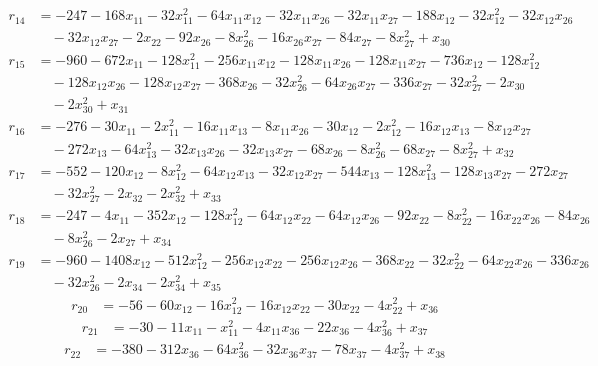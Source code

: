 \begin{align*}
r_{14}&=
-247-168x_{11}-32x_{11}^{2}-64x_{11}x_{12}-32x_{11}x_{26}-32x_{11}x_{27}-188x_{12}-32x_{12}^{2}-32x_{12}x_{26} \\
&\quad -32x_{12}x_{27}-2x_{22}-92x_{26}-8x_{26}^{2}-16x_{26}x_{27}-84x_{27}-8x_{27}^{2}+x_{30}
\end{align*}
\begin{align*}
r_{15}&=
-960-672x_{11}-128x_{11}^{2}-256x_{11}x_{12}-128x_{11}x_{26}-128x_{11}x_{27}-736x_{12}-128x_{12}^{2} \\
&\quad -128x_{12}x_{26}-128x_{12}x_{27}-368x_{26}-32x_{26}^{2}-64x_{26}x_{27}-336x_{27}-32x_{27}^{2}-2x_{30} \\
&\quad -2x_{30}^{2}+x_{31}
\end{align*}
\begin{align*}
r_{16}&=
-276-30x_{11}-2x_{11}^{2}-16x_{11}x_{13}-8x_{11}x_{26}-30x_{12}-2x_{12}^{2}-16x_{12}x_{13}-8x_{12}x_{27} \\
&\quad -272x_{13}-64x_{13}^{2}-32x_{13}x_{26}-32x_{13}x_{27}-68x_{26}-8x_{26}^{2}-68x_{27}-8x_{27}^{2}+x_{32}
\end{align*}
\begin{align*}
r_{17}&=
-552-120x_{12}-8x_{12}^{2}-64x_{12}x_{13}-32x_{12}x_{27}-544x_{13}-128x_{13}^{2}-128x_{13}x_{27}-272x_{27} \\
&\quad -32x_{27}^{2}-2x_{32}-2x_{32}^{2}+x_{33}
\end{align*}
\begin{align*}
r_{18}&=
-247-4x_{11}-352x_{12}-128x_{12}^{2}-64x_{12}x_{22}-64x_{12}x_{26}-92x_{22}-8x_{22}^{2}-16x_{22}x_{26}-84x_{26} \\
&\quad -8x_{26}^{2}-2x_{27}+x_{34}
\end{align*}
\begin{align*}
r_{19}&=
-960-1408x_{12}-512x_{12}^{2}-256x_{12}x_{22}-256x_{12}x_{26}-368x_{22}-32x_{22}^{2}-64x_{22}x_{26}-336x_{26} \\
&\quad -32x_{26}^{2}-2x_{34}-2x_{34}^{2}+x_{35}
\end{align*}
\begin{align*}
r_{20}&=
-56-60x_{12}-16x_{12}^{2}-16x_{12}x_{22}-30x_{22}-4x_{22}^{2}+x_{36}
\end{align*}
\begin{align*}
r_{21}&=
-30-11x_{11}-x_{11}^{2}-4x_{11}x_{36}-22x_{36}-4x_{36}^{2}+x_{37}
\end{align*}
\begin{align*}
r_{22}&=
-380-312x_{36}-64x_{36}^{2}-32x_{36}x_{37}-78x_{37}-4x_{37}^{2}+x_{38}
\end{align*}

